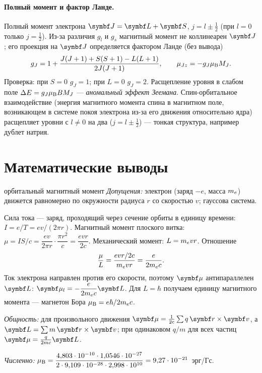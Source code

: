 \paragraph{Полный момент и фактор Ланде.} Полный момент электрона $\vect J=\vect L+\vect S$, $j=l\pm\frac12$
(при $l=0$ только $j=\frac12$). Из-за различия $g_l$ и $g_s$ магнитный момент не коллинеарен $\vect J$; его
проекция на $\vect J$ определяется фактором Ланде (без вывода)
\begin{equation}\label{eq:12:lande}
  g_J=1+\frac{J(J+1)+S(S+1)-L(L+1)}{2J(J+1)},\qquad \mu_{Jz}=-g_J\mu_{\mathrm B} M_J .
\end{equation}
Проверка: при $S=0$ $g_J=1$; при $L=0$ $g_J=2$. Расщепление уровня в слабом поле $\Delta E=g_J\mu_{\mathrm B} BM_J$ —
\emph{аномальный эффект Зеемана}. Спин-орбитальное взаимодействие (энергия магнитного момента спина в
магнитном поле, возникающем в системе покоя электрона из-за его движения относительно ядра) расщепляет
уровни с $l\neq0$ на два ($j=l\pm\frac12$) — тонкая структура, например дублет натрия.

\section{Математические выводы}

\begin{derivation}[label=der:12:orb]{орбитальный магнитный момент}
\emph{Допущения:} электрон (заряд $-e$, масса $m_e$) движется равномерно по окружности радиуса $r$ со
скоростью $v$; гауссова система.

Сила тока — заряд, проходящий через сечение орбиты в единицу времени: $I=e/T=ev/(2\pi r)$.
Магнитный момент плоского витка: $\mu=IS/c=\dfrac{ev}{2\pi r}\cdot\dfrac{\pi r^2}{c}=\dfrac{evr}{2c}$.
Механический момент: $L=m_e vr$. Отношение
\[
  \frac{\mu}{L}=\frac{evr/2c}{m_e vr}=\frac{e}{2m_e c}.
\]
Ток электрона направлен против его скорости, поэтому $\vect\mu$ антипараллелен $\vect L$:
$\vect\mu_l=-\dfrac{e}{2\mel c}\vect L$. Для $L=\hbar$ получаем единицу магнитного момента — магнетон Бора
$\mu_{\mathrm B}=e\hbar/2m_e c$.

\emph{Общность:} для произвольного движения $\vect\mu=\frac{1}{2c}\sum q\,\vect r\times\vect v$, а $\vect L=\sum m\,\vect r\times\vect v$;
при одинаковом $q/m$ для всех частиц $\vect\mu=\frac{q}{2mc}\vect L$.

\emph{Численно:} $\mu_{\mathrm B}=\dfrac{4{,}803\cdot10^{-10}\cdot1{,}0546\cdot10^{-27}}{2\cdot9{,}109\cdot10^{-28}\cdot2{,}998\cdot10^{10}}=9{,}27\cdot10^{-21}$~эрг/Гс.
\end{derivation}

